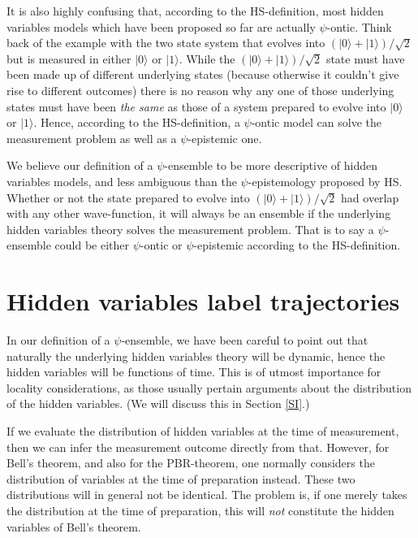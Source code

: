 \documentclass[superscriptaddress,twocolumn,floatfix,nofootinbib]{revtex4-2}
\begin{document}
It is also highly confusing that, according to the HS-definition, most hidden variables models which have been proposed so far are actually $\psi$-ontic. Think back of the example with the two state system that evolves into $(|0\rangle + |1\rangle)/\sqrt{2}$ but is measured in either $|0 \rangle$ or $|1\rangle$. While the $(|0\rangle + |1\rangle)/\sqrt{2}$ state must have been made up of different underlying states (because otherwise it couldn't give rise to different outcomes) there is no reason why any one of those underlying states must have been \emph{the same} as those of a system prepared to evolve into $|0\rangle$ or $|1 \rangle$. Hence, according to the HS-definition, a $\psi$-ontic model can solve the measurement problem as well as a $\psi$-epistemic one. 

We believe our definition of a $\psi$-ensemble to be more descriptive of hidden variables models, and less ambiguous than the $\psi$-epistemology proposed by HS. 
Whether or not the state prepared to evolve into $(|0\rangle + |1\rangle)/\sqrt{2}$ had overlap with any other wave-function, it will always be an ensemble if the underlying hidden variables theory solves the measurement problem. That is to say a $\psi$-ensemble could be either $\psi$-ontic or $\psi$-epistemic according to the HS-definition. 

\section{Hidden variables label trajectories}
\label{trajectories}

In our definition of a $\psi$-ensemble, we have been careful to point out that naturally the underlying hidden variables theory will be dynamic, hence the hidden variables will be functions of time. This is of utmost importance for locality considerations, as those usually pertain arguments about the distribution of the hidden variables. (We will discuss this in Section \ref{SI}.)

If we evaluate the distribution of hidden variables at the time of measurement, then we can infer the measurement outcome directly from that. However, for Bell's theorem, and also for the {\sc PBR}-theorem, one normally considers the distribution of variables at the time of preparation instead. These two distributions will in general not be identical. The problem is, if one merely takes the distribution at the time of preparation, this will \emph{not} constitute the hidden variables of Bell's theorem. 
\end{document}
